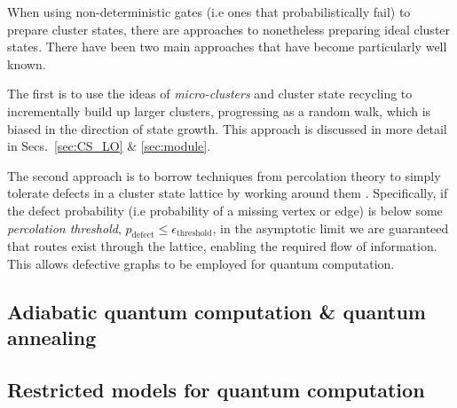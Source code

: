 When using non-deterministic gates (i.e ones that probabilistically fail) to prepare cluster states, there are approaches to nonetheless preparing ideal cluster states. There have been two main approaches that have become particularly well known. 

The first is to use the ideas of \textit{micro-clusters} and cluster state recycling to incrementally build up larger clusters, progressing as a random walk, which is biased in the direction of state growth. This approach is discussed in more detail in Secs.~\ref{sec:CS_LO} \& \ref{sec:module}.

The second approach is to borrow techniques from percolation theory to simply tolerate defects in a cluster state lattice by working around them \cite{Brown}. Specifically, if the defect probability (i.e probability of a missing vertex or edge) is below some \textit{percolation threshold}, \mbox{$p_\text{defect}\leq \epsilon_\text{threshold}$}, in the asymptotic limit we are guaranteed that routes exist through the lattice, enabling the required flow of information. This allows defective graphs to be employed for quantum computation.

%
%

\subsection{Adiabatic quantum computation \& quantum annealing} \label{sec:adiabatic_QC}  


%
%

\subsection{Restricted models for quantum computation} \label{sec:restricted_models} 


